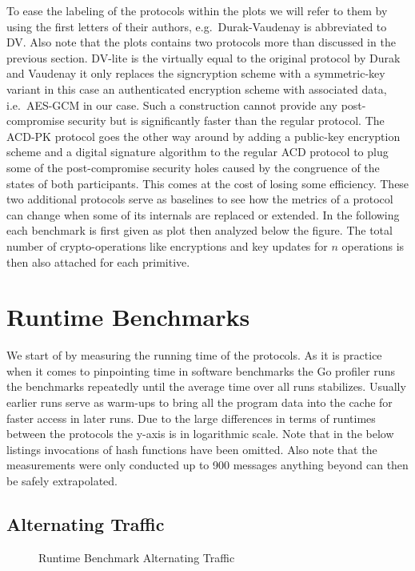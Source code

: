 \documentclass[11pt,a4paper,twoside,openright,bibliography=totoc]{scrbook}
\begin{document}
To ease the labeling of the protocols within the plots we will
refer to them by using the first letters of their authors,
e.g.~Durak-Vaudenay is abbreviated to DV. Also note that
the plots contains two protocols more than discussed in
the previous section. DV-lite is the virtually equal to
the original protocol by Durak and Vaudenay it only replaces
the signcryption scheme with a symmetric-key variant in
this case an authenticated encryption scheme with associated
data, i.e.~AES-GCM in our case. Such a construction cannot provide
any post-compromise security but is significantly faster
than the regular protocol. The ACD-PK protocol goes the other way around
by adding a public-key encryption scheme and a digital signature
algorithm to the regular ACD protocol to plug some
of the post-compromise security holes caused by
the congruence of the states of both participants.
This comes at the cost of losing some efficiency.
These two additional protocols serve as baselines
to see how the metrics of a protocol can change when
some of its internals are replaced or extended. In the
following each benchmark is first given as plot then
analyzed below the figure.
The total number of
crypto-operations like encryptions and key updates
for $n$ operations is then also attached for each
primitive.

\section{Runtime Benchmarks}
\label{sec:runtime-benchmarks}

We start of by measuring the running time of the protocols. As
it is practice when it comes to pinpointing time in software
benchmarks the Go profiler runs the benchmarks repeatedly
until the average time over all runs stabilizes. Usually
earlier runs serve as warm-ups to bring all the program
data into the cache for faster access in later runs.
Due to the large differences in terms
of runtimes between the protocols the y-axis is
in logarithmic scale.
Note that in the below listings invocations of
hash functions have been omitted.
Also note that the measurements were only conducted up
to 900 messages anything beyond can then be safely extrapolated.

\subsection{Alternating Traffic}
\label{sec:alternating-traffic}

\begin{figure}[H]
  \centering
   
  \caption{Runtime Benchmark Alternating Traffic}
  \label{fig:time-alt}
\end{figure}
\end{document}
